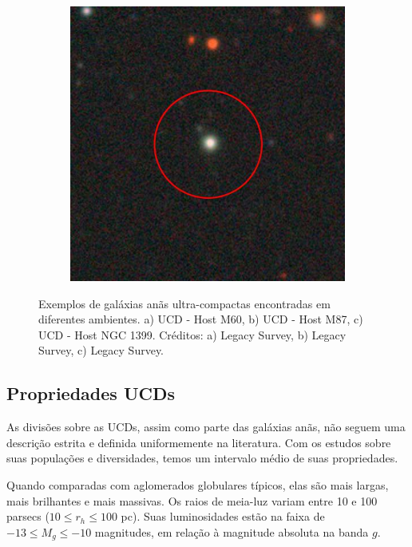 \begin{figure}[!ht]
\begin{subfigure}[b]{0.3\textwidth}
        \caption{}
    \end{subfigure}
    \begin{subfigure}[b]{0.3\textwidth}
        \includegraphics[width=\textwidth]{Images/ucds_exp/UCD_NGC1399.png}
        \caption{}
    \end{subfigure}
    \caption{Exemplos de galáxias anãs ultra-compactas encontradas em diferentes ambientes. a) UCD - Host M60, b) UCD - Host M87, c) UCD - Host NGC 1399. Créditos: a) Legacy Survey, b) Legacy Survey, c) Legacy Survey.}
    \label{UCDs_exp}
\end{figure}

\subsection{Propriedades UCDs}\label{subsec:propriedade}
As divisões sobre as UCDs, assim como parte das galáxias anãs, não seguem uma descrição estrita e definida uniformemente na literatura. Com os estudos sobre suas populações e diversidades, temos um intervalo médio de suas propriedades.

Quando comparadas com aglomerados globulares típicos, elas são mais largas, mais brilhantes e mais massivas. Os raios de meia-luz variam entre 10 e 100 parsecs ($10 \leq r_h \leq 100$ pc). Suas luminosidades estão na faixa de $-13 \leq M_g \leq -10$ magnitudes, em relação à magnitude absoluta na banda $g$.

